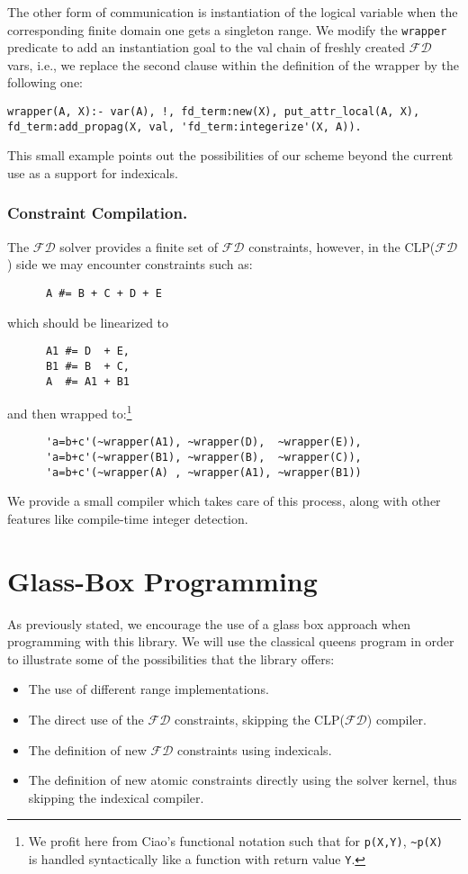 \documentclass{llncs}
\newcommand{\clpfd}{CLP($\mathcal{FD}$)\xspace}
\newcommand{\fd}{$\mathcal{FD}$\xspace}
\begin{document}
The other form of communication is instantiation of the logical
variable when the corresponding finite domain one gets a singleton
range. We modify the \verb!wrapper! predicate to add an instantiation
goal to the val chain of freshly created \fd vars, i.e., we replace the
second clause within the definition of the wrapper by the following one:
\begin{lstlisting}
wrapper(A, X):- var(A), !, fd_term:new(X), put_attr_local(A, X),
fd_term:add_propag(X, val, 'fd_term:integerize'(X, A)).
\end{lstlisting}
This small example points out the possibilities of our scheme beyond
the current use as a support for indexicals.

\subsubsection{Constraint Compilation.}

The \fd solver provides a finite set of \fd constraints, however, in
the \clpfd side we may encounter constraints such as:
\begin{lstlisting}
      A #= B + C + D + E
\end{lstlisting}
which should be linearized to
\begin{lstlisting}
      A1 #= D  + E,
      B1 #= B  + C,
      A  #= A1 + B1
\end{lstlisting}
and then wrapped to:\footnote{We profit here from Ciao's functional
  notation such that for {\tt p(X,Y)}, {\tt \textasciitilde p(X) } is
  handled syntactically like a function with return value {\tt Y}.}
\begin{lstlisting}
      'a=b+c'(~wrapper(A1), ~wrapper(D),  ~wrapper(E)),
      'a=b+c'(~wrapper(B1), ~wrapper(B),  ~wrapper(C)),
      'a=b+c'(~wrapper(A) , ~wrapper(A1), ~wrapper(B1))
\end{lstlisting}
We provide a small compiler which takes care of this process, along
with other features like compile-time integer detection.

\section{Glass-Box Programming}
\label{sec:glass-box-effect}
As previously stated, we encourage the use of a glass box approach
when programming with this library. We will use the classical
queens program in order to illustrate some of the possibilities that
the library offers:
\begin{itemize}
\item The use of different range implementations.
\item The direct use of the \fd constraints, skipping the \clpfd compiler.
\item The definition of new \fd constraints using indexicals.
\item The definition of new atomic constraints directly using the
  solver kernel, thus skipping the indexical compiler.
\end{itemize}
\end{document}
